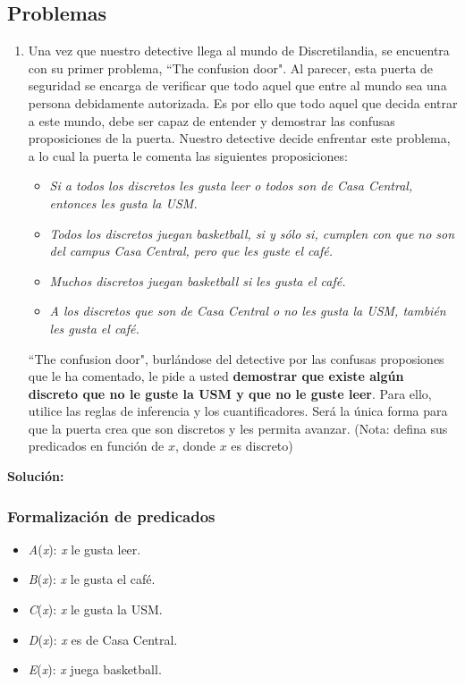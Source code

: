 \documentclass[letterpaper,10pt]{article}
\begin{document}
\subsection{Problemas}
\begin{enumerate}
    \item Una vez que nuestro detective llega al mundo de Discretilandia, se encuentra con su primer problema, ``The confusion door". Al parecer, esta puerta de seguridad se encarga de verificar que todo aquel que entre al mundo sea una persona debidamente autorizada. Es por ello que todo aquel que decida entrar a este mundo, debe ser capaz de entender y demostrar las confusas proposiciones de la puerta. Nuestro detective decide enfrentar este problema, a lo cual la puerta le comenta las siguientes proposiciones:
    \begin{itemize}
        \item \textit{Si a todos los discretos les gusta leer o todos son de Casa Central, entonces les gusta la USM.}
        \item \textit{Todos los discretos juegan basketball, si y sólo si, cumplen con que no son del campus Casa Central, pero que les guste el café.}
        \item \textit{Muchos discretos juegan basketball si les gusta el café.}
        \item \textit{A los discretos que son de Casa Central o no les gusta la USM, también les gusta el café.}
    \end{itemize}
    ``The confusion door", burlándose del detective por las confusas proposiones que le ha comentado, le pide a usted \textbf{demostrar que existe algún discreto que no le guste la USM y que no le guste leer}. Para ello, utilice las reglas de inferencia y los cuantificadores. Será la única forma para que la puerta crea que son discretos y les permita avanzar. (Nota: defina sus predicados en función de $x$, donde $x$ es discreto)
\end{enumerate}

\newpage
\textbf{Solución:}
\subsubsection{Formalizaci\'on de predicados}
\begin{minipage}[t]{0.4\textwidth}
\begin{itemize}
    \item \textit{A}(\textit{x}): \textit{x} le gusta leer.
    \item \textit{B}(\textit{x}): \textit{x} le gusta el café.
    \item \textit{C}(\textit{x}): \textit{x} le gusta la USM.
    \item \textit{D}(\textit{x}): \textit{x} es de Casa Central.
    \item \textit{E}(\textit{x}): \textit{x} juega basketball.
\end{itemize}
\end{minipage}
\end{document}
